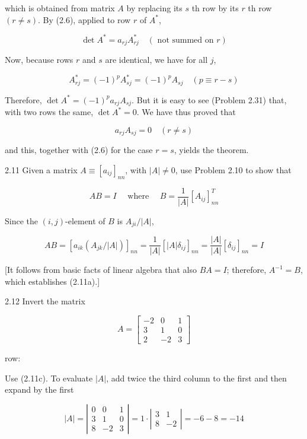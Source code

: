 \documentclass[10pt]{article}
\begin{document}
which is obtained from matrix $A$ by replacing its $s$ th row by its $r$ th row $(r \neq s)$. By (2.6), applied to row $r$ of $A^{*}$,

$$
\operatorname{det} A^{*}=a_{r j} A_{r j}^{*} \quad(\text { not summed on } r)
$$

Now, because rows $r$ and $s$ are identical, we have for all $j$,

$$
A_{r j}^{*}=(-1)^{p} A_{s j}^{*}=(-1)^{p} A_{s j} \quad(p \equiv r-s)
$$

Therefore, $\operatorname{det} A^{*}=(-1)^{p} a_{r j} A_{s j}$. But it is easy to see (Problem 2.31) that, with two rows the same, $\operatorname{det} A^{*}=0$. We have thus proved that

$$
a_{r j} A_{s j}=0 \quad(r \neq s)
$$

and this, together with (2.6) for the case $r=s$, yields the theorem.

2.11 Given a matrix $A \equiv\left[a_{i j}\right]_{n n}$, with $|A| \neq 0$, use Problem 2.10 to show that

$$
A B=I \quad \text { where } \quad B=\frac{1}{|A|}\left[A_{i j}\right]_{n n}^{T}
$$

Since the $(i, j)$-element of $B$ is $A_{j i} /|A|$,

$$
A B=\left[a_{i k}\left(A_{j k} /|A|\right)\right]_{n n}=\frac{1}{|A|}\left[|A| \delta_{i j}\right]_{n n}=\frac{|A|}{|A|}\left[\delta_{i j}\right]_{n n}=I
$$

[It follows from basic facts of linear algebra that also $B A=I$; therefore, $A^{-1}=B$, which establishes (2.11a).]

2.12 Invert the matrix

$$
A=\left[\begin{array}{rrr}
-2 & 0 & 1 \\
3 & 1 & 0 \\
2 & -2 & 3
\end{array}\right]
$$

row:

Use (2.11c). To evaluate $|A|$, add twice the third column to the first and then expand by the first

$$
|A|=\left|\begin{array}{rrr}
0 & 0 & 1 \\
3 & 1 & 0 \\
8 & -2 & 3
\end{array}\right|=1 \cdot\left|\begin{array}{rr}
3 & 1 \\
8 & -2
\end{array}\right|=-6-8=-14
$$
\end{document}
